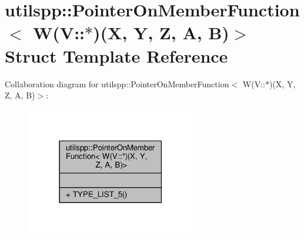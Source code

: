 \hypertarget{structutilspp_1_1PointerOnMemberFunction_3_01W_07V_1_1_5_08_07X_00_01Y_00_01Z_00_01A_00_01B_08_4}{\section{utilspp\-:\-:Pointer\-On\-Member\-Function$<$ W(V\-:\-:$\ast$)(X, Y, Z, A, B)$>$ Struct Template Reference}
\label{structutilspp_1_1PointerOnMemberFunction_3_01W_07V_1_1_5_08_07X_00_01Y_00_01Z_00_01A_00_01B_08_4}
}


Collaboration diagram for utilspp\-:\-:Pointer\-On\-Member\-Function$<$ W(V\-:\-:$\ast$)(X, Y, Z, A, B)$>$\-:\nopagebreak
\begin{figure}[H]
\begin{center}
\leavevmode
\includegraphics[width=210pt]{structutilspp_1_1PointerOnMemberFunction_3_01W_07V_1_1_5_08_07X_00_01Y_00_01Z_00_01A_00_01B_08_4__coll__graph}
\end{center}
\end{figure}
